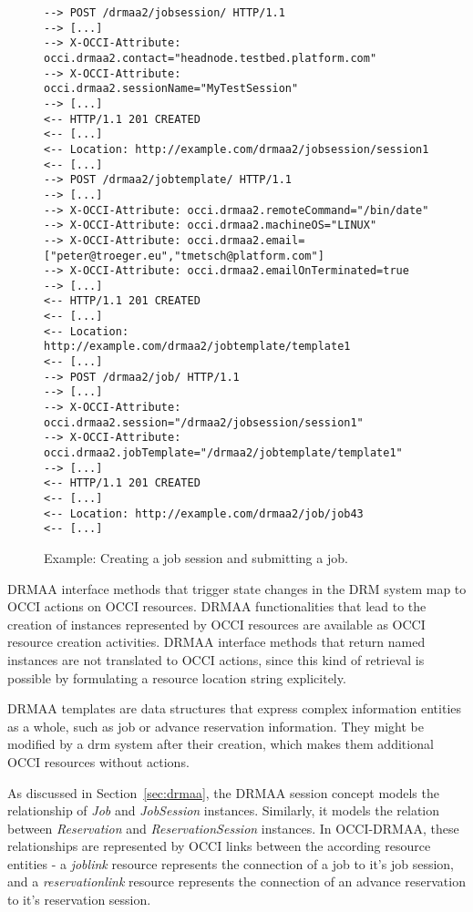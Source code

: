 \documentclass[twocolumn]{svjour3}       %
\begin{document}
\begin{figure*}
\center
\begin{lstlisting}
--> POST /drmaa2/jobsession/ HTTP/1.1
--> [...]
--> X-OCCI-Attribute: occi.drmaa2.contact="headnode.testbed.platform.com"
--> X-OCCI-Attribute: occi.drmaa2.sessionName="MyTestSession"
--> [...]
<-- HTTP/1.1 201 CREATED 
<-- [...] 
<-- Location: http://example.com/drmaa2/jobsession/session1
<-- [...]
--> POST /drmaa2/jobtemplate/ HTTP/1.1
--> [...]
--> X-OCCI-Attribute: occi.drmaa2.remoteCommand="/bin/date"
--> X-OCCI-Attribute: occi.drmaa2.machineOS="LINUX"
--> X-OCCI-Attribute: occi.drmaa2.email=["peter@troeger.eu","tmetsch@platform.com"]
--> X-OCCI-Attribute: occi.drmaa2.emailOnTerminated=true
--> [...]
<-- HTTP/1.1 201 CREATED 
<-- [...] 
<-- Location: http://example.com/drmaa2/jobtemplate/template1
<-- [...]
--> POST /drmaa2/job/ HTTP/1.1
--> [...]
--> X-OCCI-Attribute: occi.drmaa2.session="/drmaa2/jobsession/session1"
--> X-OCCI-Attribute: occi.drmaa2.jobTemplate="/drmaa2/jobtemplate/template1"
--> [...]
<-- HTTP/1.1 201 CREATED 
<-- [...] 
<-- Location: http://example.com/drmaa2/job/job43
<-- [...]
\end{lstlisting}
\caption{Example: Creating a job session and submitting a job.}
\label{fig:createjob} 
\end{figure*}

DRMAA interface methods that trigger state changes in the DRM system map to OCCI actions on OCCI resources. DRMAA functionalities that lead to the creation of instances represented by OCCI resources are available as OCCI resource creation activities. DRMAA interface methods that return named instances are not translated to OCCI actions, since this kind of retrieval is possible by formulating a resource location string explicitely. 

DRMAA templates are data structures that express complex information entities as a whole, such as job or advance reservation information. They might be modified by a \gls{drm} system after their creation, which makes them additional OCCI resources without actions.

As discussed in Section~\ref{sec:drmaa}, the DRMAA session concept models the relationship of \emph{Job} and \emph{JobSession} instances. Similarly, it models the relation between \emph{Reservation} and \emph{ReservationSession} instances. In OCCI-DRMAA, these relationships are represented by OCCI links between the according resource entities -  a \emph{joblink} resource represents the connection of a job to it's job session, and a \emph{reservationlink} resource represents the connection of an advance reservation to it's reservation session.
\end{document}
